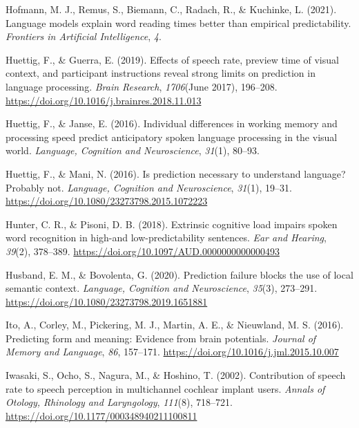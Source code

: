 \documentclass[a4paper, nobind]{templates/ociamthesis}
\newlength{\cslhangindent}
\newenvironment{CSLReferences}[2] %
 {%
  \setlength{\parindent}{0pt}
  \ifodd #1
  \let\oldpar\par
  \def\par{\hangindent=\cslhangindent\oldpar}
  \fi
  \setlength{\parskip}{1mm}
  \setlength{\baselineskip}{6mm}
 }%
 {}
\begin{document}
\begin{CSLReferences}{1}{0}
\leavevmode{}%
Hofmann, M. J., Remus, S., Biemann, C., Radach, R., \& Kuchinke, L. (2021). Language models explain word reading times better than empirical predictability. \emph{Frontiers in Artificial Intelligence}, \emph{4}.

\leavevmode{}%
Huettig, F., \& Guerra, E. (2019). {Effects of speech rate, preview time of visual context, and participant instructions reveal strong limits on prediction in language processing}. \emph{Brain Research}, \emph{1706}(June 2017), 196--208. \url{https://doi.org/10.1016/j.brainres.2018.11.013}

\leavevmode{}%
Huettig, F., \& Janse, E. (2016). Individual differences in working memory and processing speed predict anticipatory spoken language processing in the visual world. \emph{Language, Cognition and Neuroscience}, \emph{31}(1), 80--93.

\leavevmode{}%
Huettig, F., \& Mani, N. (2016). Is prediction necessary to understand language? Probably not. \emph{Language, Cognition and Neuroscience}, \emph{31}(1), 19--31. \url{https://doi.org/10.1080/23273798.2015.1072223}

\leavevmode{}%
Hunter, C. R., \& Pisoni, D. B. (2018). {Extrinsic cognitive load impairs spoken word recognition in high-and low-predictability sentences}. \emph{Ear and Hearing}, \emph{39}(2), 378--389. \url{https://doi.org/10.1097/AUD.0000000000000493}

\leavevmode{}%
Husband, E. M., \& Bovolenta, G. (2020). {Prediction failure blocks the use of local semantic context}. \emph{Language, Cognition and Neuroscience}, \emph{35}(3), 273--291. \url{https://doi.org/10.1080/23273798.2019.1651881}

\leavevmode{}%
Ito, A., Corley, M., Pickering, M. J., Martin, A. E., \& Nieuwland, M. S. (2016). {Predicting form and meaning: Evidence from brain potentials}. \emph{Journal of Memory and Language}, \emph{86}, 157--171. \url{https://doi.org/10.1016/j.jml.2015.10.007}

\leavevmode{}%
Iwasaki, S., Ocho, S., Nagura, M., \& Hoshino, T. (2002). {Contribution of speech rate to speech perception in multichannel cochlear implant users}. \emph{Annals of Otology, Rhinology and Laryngology}, \emph{111}(8), 718--721. \url{https://doi.org/10.1177/000348940211100811}


\end{CSLReferences}
\end{document}
